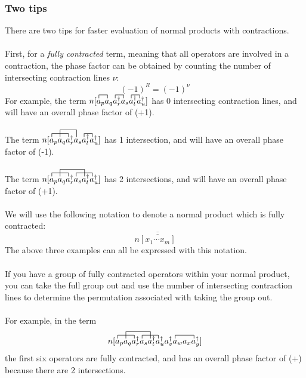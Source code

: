 \documentclass{article}
\newcommand{\ol}{\overline}
\newcommand{\dg}{\ensuremath{^\dagger} }
\newcommand{\cd}{\ensuremath{\cdots} }
\begin{document}
\subsubsection{Two tips}
There are two tips for faster evaluation of normal products with contractions. \\ \\
First, for a \textit{fully contracted} term, meaning that all operators are involved in a contraction, 
the phase factor can be obtained by counting the number of intersecting contraction lines $\nu$: 
\[(-1)^R = (-1)^\nu\]
For example, the term 
$\contraction{n[}{a}{{}_p}{a}
\contraction{n[a_p a_q  }{a}{{}_r\dg }{a}
\contraction{n[a_p a_q a_r\dg a_s }{a}{{}_t\dg}{a}
n[a_p a_q a_r\dg a_s a_t\dg a_u\dg] $
has 0 intersecting contraction lines, and will have an overall phase factor of (+1).  \\ \\
The term 
$\contraction{n[}{a}{{}_p a_q}{a}
\contraction[2ex]{n[a_p }{a}{{}_q a_r\dg }{a}
\contraction{n[a_p a_q a_r\dg a_s  }{a}{{}_t\dg}{a}
n[a_p a_q a_r\dg a_s a_t\dg a_u\dg] $ has 1 intersection, and will have an overall phase factor of (-1).  \\ \\
The term
$\contraction{n[}{a}{{}_p a_q}{a}
\contraction[2ex]{n[a_p }{a}{{}_q a_r\dg a_s }{a}
\contraction{n[a_p a_q a_r\dg }{a}{{}_s a_t\dg }{a}
n[a_p a_q a_r\dg a_s a_t\dg a_u\dg] $ has 2 intersections, and will have an overall phase factor of (+1). \\ \\
We will use the following notation to denote a normal product which is fully contracted: 
\[n\ol{\ol{[x_1 \cd x_m]}} \]
The above three examples can all be expressed with this notation. \\ \\
If you have a group of fully contracted operators within your normal product, you can take the full group out and use the number of intersecting contraction lines
to determine the permutation associated with taking the group out.  \\ \\
For example, in the term 
\[\contraction{n[}{a}{{}_p a_q}{a}
\contraction[2ex]{n[a_p }{a}{{}_q a_r\dg a_s }{a}
\contraction{n[a_p a_q a_r\dg }{a}{{}_s a_t\dg }{a}
\contraction{n[a_p a_q a_r\dg a_s a_t\dg a_u\dg a_v\dg}{a}{{}_w a_x}{a}
n[a_p a_q a_r\dg a_s a_t\dg a_u\dg a_v\dg a_w a_x a_y\dg] \]
the first six operators are fully contracted, and has an overall phase factor of (+) because there are 2 intersections.
\end{document}
